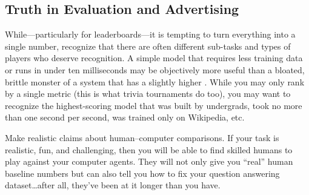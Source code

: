 \subsection{Truth in Evaluation and Advertising}

While---particularly for leaderboards---it is tempting to turn everything into a single number, recognize that there are often different sub-tasks and types of players who deserve recognition.
A simple model that requires less training data or runs in under ten milliseconds may be objectively more useful than a bloated, brittle monster of a system that has a slightly higher \fone{}.
While you may only rank by a single metric (this is what trivia tournaments do too), you may want to recognize the highest-scoring model that was built by undergrads, took no more than one second per second, was trained only on Wikipedia, etc.

Make realistic claims about human--computer comparisons.
If your task is realistic, fun, and challenging, then you will be able to find skilled humans to play against your computer agents.
They will not only give you ``real'' human baseline numbers but can also tell you how to fix your question answering dataset\dots after all, they've been at it longer than you have.

